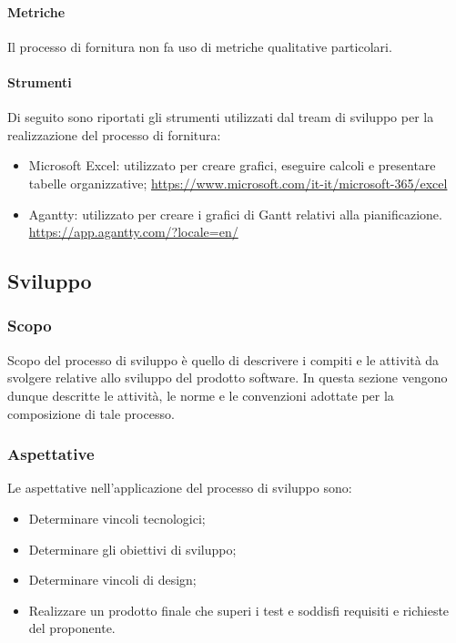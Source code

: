 \paragraph{Metriche}\label{paragraph: metriche_fornitura}
Il processo di fornitura non fa uso di metriche qualitative particolari.
\paragraph{Strumenti}\label{paragraph: strumenti_fornitura}
Di seguito sono riportati gli strumenti utilizzati dal tream di sviluppo per la realizzazione del processo di fornitura:
\begin{itemize}
    \item Microsoft Excel: utilizzato per creare grafici, eseguire calcoli e presentare tabelle organizzative; 
    \url{https://www.microsoft.com/it-it/microsoft-365/excel}
    \item Agantty: utilizzato per creare i grafici di Gantt relativi alla pianificazione. 
    \url{https://app.agantty.com/?locale=en/}
\end{itemize}
\subsection{Sviluppo} \label{subsection:Sviluppo}
    \subsubsection{Scopo} \label{subsubsection:Scopo}
    Scopo del processo di sviluppo è quello di descrivere i compiti e le attività da svolgere relative allo sviluppo del prodotto software.
    In questa sezione vengono dunque descritte le attività, le norme e le convenzioni adottate per la composizione di tale processo.

    \subsubsection{Aspettative} \label{subsubsection:Aspettative}
    Le aspettative nell’applicazione del processo di sviluppo sono:
    \begin{itemize}
        \item Determinare vincoli tecnologici;
        \item Determinare gli obiettivi di sviluppo;
        \item Determinare vincoli di design;
        \item Realizzare un prodotto finale che superi i test e soddisfi requisiti e richieste del proponente.
    \end{itemize}

